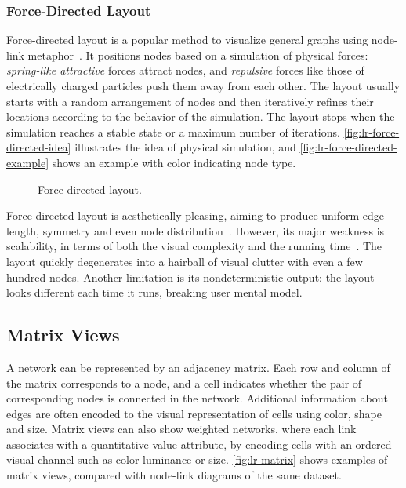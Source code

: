 \subsubsection{Force-Directed Layout}
Force-directed layout is a popular method to visualize general graphs using node-link metaphor~\cite{Eades1984}. It positions nodes based on a simulation of physical forces: \emph{spring-like attractive} forces attract nodes, and \emph{repulsive} forces like those of electrically charged particles push them away from each other. The layout usually starts with a random arrangement of nodes and then iteratively refines their locations according to the behavior of the simulation. The layout stops when the simulation reaches a stable state or a maximum number of iterations. \autoref{fig:lr-force-directed-idea} illustrates the idea of physical simulation, and \autoref{fig:lr-force-directed-example} shows an example with color indicating node type.

\begin{figure}[!htb]
\centering
{}
\hfill
{}
\caption{Force-directed layout.}
\end{figure}

Force-directed layout is aesthetically pleasing, aiming to produce uniform edge length, symmetry and even node distribution~\cite{Fruchterman1991}. However, its major weakness is scalability, in terms of both the visual complexity and the running time~\cite{Munzner2014}. The layout quickly degenerates into a hairball of visual clutter with even a few hundred nodes. Another limitation is its nondeterministic output: the layout looks different each time it runs, breaking user mental model.

\subsection{Matrix Views}
A network can be represented by an adjacency matrix. Each row and column of the matrix corresponds to a node, and a cell indicates whether the pair of corresponding nodes is connected in the network. Additional information about edges are often encoded to the visual representation of cells using color, shape and size. Matrix views can also show weighted networks, where each link associates with a quantitative value attribute, by encoding cells with an ordered visual channel such as color luminance or size. \autoref{fig:lr-matrix} shows examples of matrix views, compared with node-link diagrams of the same dataset.

